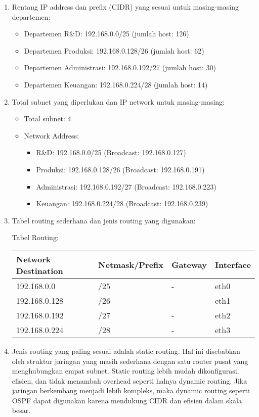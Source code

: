 \begin{enumerate}
    \item Rentang IP address dan prefix (CIDR) yang sesuai untuk masing-masing departemen:

    \begin{itemize}
        \item Departemen R\&D: 192.168.0.0/25 (jumlah host: 126)
        \item Departemen Produksi: 192.168.0.128/26 (jumlah host: 62)
        \item Departemen Administrasi: 192.168.0.192/27 (jumlah host: 30)
        \item Departemen Keuangan: 192.168.0.224/28 (jumlah host: 14)
    \end{itemize}

    \item Total subnet yang diperlukan dan IP network untuk masing-masing:

    \begin{itemize}
        \item Total subnet: 4
        \item Network Address:
        \begin{itemize}
            \item R\&D: 192.168.0.0/25 (Broadcast: 192.168.0.127)
            \item Produksi: 192.168.0.128/26 (Broadcast: 192.168.0.191)
            \item Administrasi: 192.168.0.192/27 (Broadcast: 192.168.0.223)
            \item Keuangan: 192.168.0.224/28 (Broadcast: 192.168.0.239)
        \end{itemize}
    \end{itemize}

    \item Tabel routing sederhana dan jenis routing yang digunakan:

    Tabel Routing:

    \begin{center}
    \begin{tabular}{|l|l|l|l|}
        \hline
        Network Destination & Netmask/Prefix & Gateway & Interface \\
        \hline
        192.168.0.0 & /25 & - & eth0 \\
        192.168.0.128 & /26 & - & eth1 \\
        192.168.0.192 & /27 & - & eth2 \\
        192.168.0.224 & /28 & - & eth3 \\
        \hline
    \end{tabular}
    \end{center}

    \item Jenis routing yang paling sesuai adalah static routing. Hal ini disebabkan oleh struktur jaringan yang masih sederhana dengan satu router pusat yang menghubungkan empat subnet. Static routing lebih mudah dikonfigurasi, efisien, dan tidak menambah overhead seperti halnya dynamic routing. Jika jaringan berkembang menjadi lebih kompleks, maka dynamic routing seperti OSPF dapat digunakan karena mendukung CIDR dan efisien dalam skala besar.
\end{enumerate}